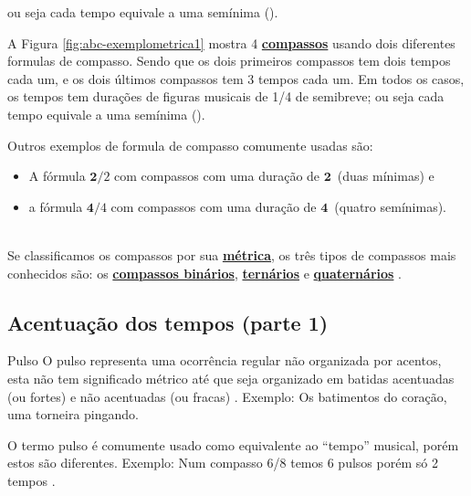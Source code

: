 \begin{description}
\begin{example}
ou seja cada tempo equivale a uma semínima (\Vier). 
\end{example}
\begin{example}
A Figura \ref{fig:abc-exemplometrica1} mostra 4 \hyperref[def:Compasso]{\textbf{compassos}} usando dois diferentes formulas de compasso.
Sendo que os dois primeiros compassos tem dois tempos cada um, 
e os dois últimos compassos tem 3 tempos cada um.
Em todos os casos, os tempos tem durações de figuras musicais de 1/4 de semibreve;
ou seja cada tempo equivale a uma semínima (\Vier). 
\end{example}
\begin{example}
Outros exemplos de formula de compasso comumente usadas são:
\begin{itemize}
\item A fórmula $\mathbf{2}/2$ com compassos com uma duração de $\mathbf{2}$\halfnote ~(duas mínimas) e
\item a fórmula $\mathbf{4}/4$ com compassos com uma duração de $\mathbf{4}$\quarternote ~(quatro semínimas). 
\end{itemize}
\end{example}
\end{description}~\\


Se classificamos os compassos por sua \hyperref[def:Metrica]{\textbf{métrica}}, 
os três tipos de compassos mais conhecidos são: 
os \hyperref[subsec:compassobinario]{\textbf{compassos binários}}, 
\hyperref[subsec:compassoternario]{\textbf{ternários}} e 
\hyperref[subsec:compassoquaternario]{\textbf{quaternários}} \cite[pp. 27]{adolfo2002musica}.



\subsection{Acentuação dos tempos (parte 1)}
\label{subsec:acentuacion1}



\begin{tcbinformation}{Pulso}
\label{ref:Pulso}
O pulso representa uma ocorrência regular não organizada por acentos,
esta não tem significado métrico até que seja organizado em batidas acentuadas (ou fortes) 
e não acentuadas (ou fracas) \cite[pp. 22]{holland2013music}. 
Exemplo: Os batimentos do coração, uma torneira pingando.

O termo pulso é comumente usado como equivalente ao ``tempo'' musical,
porém estos são diferentes.
Exemplo: Num compasso 6/8 temos 6 pulsos porém só 2 tempos \cite[pp. 1228]{latham2008diccionario}.
\end{tcbinformation} 

